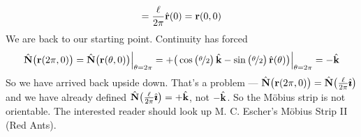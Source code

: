 \begin{eg}
\begin{equation*}
=\frac{\ell}{2\pi}\hat{\mathbf{r}}(0)=\mathbf{r}(0,0)
\end{equation*}
We are back to our starting point. Continuity has forced
\begin{equation*}
\hat{\mathbf{N}}\big(\mathbf{r}(2\pi,0)\big)
=\hat{\mathbf{N}}\big(\mathbf{r}(\theta,0)\big)\Big|_{\theta=2\pi}
=+\big(\cos\big(\nicefrac{\theta}{2}\big)\,\hat{\mathbf{k}}
                       -\sin\big(\nicefrac{\theta}{2}\big)\,\hat{\mathbf{r}}(\theta) \big)
\Big|_{\theta=2\pi}
=-\hat{\mathbf{k}}
\end{equation*}
So we have arrived back upside down.
That's a problem --- $\hat{\mathbf{N}}\big(\mathbf{r}(2\pi,0)\big)
=\hat{\mathbf{N}}\big(\frac{\ell}{2\pi}\hat{\pmb{\imath}}\big)$
and we have already defined $\hat{\mathbf{N}}\big(\frac{\ell}{2\pi}\hat{\pmb{\imath}}\big)=+\hat{\mathbf{k}}$, not $-\hat{\mathbf{k}}$. So the M\"obius strip is not orientable. The interested reader
should look up M. C. Escher's M\"obius Strip II (Red Ants).

\end{eg}










